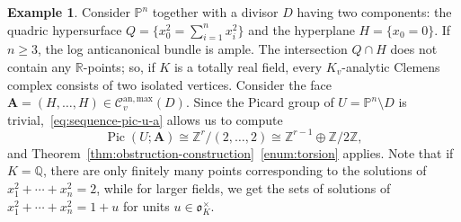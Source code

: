 \documentclass[a4paper, twoside, 10pt]{amsart}
\newcommand{\uA}{{\boldsymbol{A}}}
\newcommand{\cC}{\mathcal{C}}
\newcommand{\fo}{\mathfrak{o}}
\newcommand{\PP}{\mathbb{P}}
\newcommand{\RR}{\mathbb{R}}
\newcommand{\ZZ}{\mathbb{Z}}
\newcommand{\QQ}{\mathbb{Q}}
\newcommand{\Canmax}{\cC^{\mathrm{an,max}}}
\DeclareMathOperator{\Pic}{Pic}
\theoremstyle{definition}
\newtheorem{example}[theorem]{Example}
\begin{document}
\begin{example}
  Consider $\PP^n$ together with a divisor $D$ having two components: the quadric hypersurface $Q=\{x_0^2=\sum_{i=1}^n x_i^2\}$ and the hyperplane $H=\{x_0=0\}$. If $n\ge 3$, the log anticanonical bundle is ample. The intersection $Q\cap H$ does not contain any $\RR$-points; so, if $K$ is a totally real field, every $K_v$-analytic Clemens complex consists of two isolated vertices. Consider the face $\uA=(H,\dots,H)\in\Canmax_v(D)$. Since the Picard group of $U=\PP^n\setminus D$ is trivial,~\eqref{eq:sequence-pic-u-a} allows us to compute
  \[
    \Pic(U;\uA) \cong \ZZ^r/(2,\dots,2) \cong \ZZ^{r-1} \oplus \ZZ/2\ZZ,
  \]
  and Theorem~\ref{thm:obstruction-construction}~\eqref{enum:torsion} applies.
  Note that if $K=\QQ$, there are only finitely many points corresponding to the solutions of $x_1^2 + \cdots + x_n^2 = 2$, while for larger fields, we get the sets of solutions of
  $x_1^2 + \cdots + x_n^2 = 1 + u$
  for units $u\in\fo_K^\times$.
\end{example}
\end{document}
